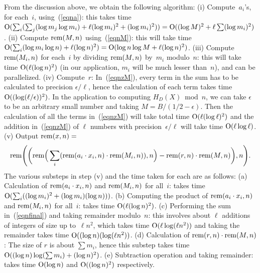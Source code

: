 \documentclass{amsart}
\newcommand{\nn}{\newline \noindent}
\newcommand{\noi}{\noindent}
\newcommand{\bigo}{{\rm O}}
\newcommand{\rem}{{\rm rem}}
\theoremstyle{plain}
\begin{document}
From the discussion above, we obtain the following algorithm:
\nn (i) Compute~$a_i$'s, for each~$i$, using~(\ref{eqna}): this takes
time $\bigo(\sum_i ( \sum_j (\log m_j \log m_i) + \ell (\log m_i)^2
+ (\log m_i)^2)) = \bigo((\log M)^2 + \ell \sum (\log m_i)^2)$.
\nn (ii) Compute $\rem(M,n)$ using~(\ref{eqnM}): this will take
time $\bigo(\sum_i (\log m_i \log n) + \ell (\log n)^2 )
=\bigo(\log n \log M + \ell (\log n)^2 )$.
\nn (iii) Compute $\rem(M_i,n)$ for each~$i$ by
dividing $\rem(M,n)$ by~$m_i$ modulo~$n$: this will take time
$\bigo(\ell (\log n)^2)$ (in our application, $m_i$ will be much
lesser than~$n$), and can be parallelized.
\nn (iv) Compute~$r$: 
In~(\ref{eqnzM}), every term in the sum has to be calculated
to precision $\epsilon/\ell$, hence the calculation of each
term takes time $\bigo( (\log(\ell/ \epsilon))^2 )$. 
In the application to computing $H_D(X) \bmod n$, 
we can take $\epsilon$ to be an arbitrary small number 
and taking $M = B/(1/2-\epsilon)$.
Then the calculation of all the terms in~(\ref{eqnzM}) 
will take total time $\bigo(\ell (\log \ell)^2)$ 
and the addition in~(\ref{eqnzM}) of $\ell$ numbers with 
precision~$\epsilon/\ell$ will take time $\bigo(\ell \log \ell)$.
\nn (v) 
Output $\rem(x,n) = $
\begin{eqnarray} \label{eqnfinal}
\rem \Bigg( \bigg( \rem \Big( \sum_i (\rem(a_i \cdot x_i,n) \cdot \rem(M_i,n) ), n \Big)
- \rem(r,n) \cdot \rem(M,n) \bigg), n \Bigg).
\end{eqnarray}
The various substeps in step (v) and the time taken for each are as follows:
\nn (a) Calculation of $\rem(a_i \cdot x_i,n)$ and $\rem(M_i,n)$
for all~$i$:
takes time $\bigo(\sum_i ((\log m_i)^2 + (\log m_i)(\log n)))$.
\nn (b) Computing the product of $\rem(a_i \cdot x_i,n)$ and
$\rem(M_i,n)$ for all~$i$: takes time $\bigo(\ell (\log n)^2)$.
\nn (c) Performing the sum in~(\ref{eqnfinal}) and taking remainder
modulo~$n$: this involves about $\ell$ additions of
integers of size up to~$\ell n^2$, which takes time 
$\bigo(\ell \log(\ell n^2))$ and taking the remainder takes time 
$\bigo((\log n)(\log(\ell n^2))$.
\nn (d) Calculation of $\rem(r,n) \cdot \rem(M,n)$: The size of $r$ is
about $\sum m_i$, hence this substep takes time 
$\bigo((\log n) \log (\sum m_i) + (\log n)^2)$.
\nn (e) Subtraction operation and taking remainder: takes time 
$\bigo(\log n)$ and $\bigo((\log n)^2)$ respectively.
\end{document}
